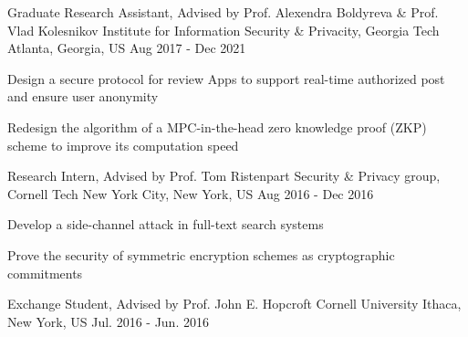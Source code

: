 


\begin{cventries}


\cventry
{Graduate Research Assistant, Advised by Prof. Alexendra Boldyreva \& Prof. Vlad Kolesnikov} %
{Institute for Information Security \& Privacity, Georgia Tech} %
{Atlanta, Georgia, US} %
{Aug 2017 - Dec 2021} %
{ %
\begin{cvitems}
\item {Design a secure protocol for review Apps to support real-time authorized post and ensure user anonymity}
\item {Redesign the algorithm of a MPC-in-the-head zero knowledge proof (ZKP) scheme to improve its computation speed}
\end{cvitems}
}


\cventry
{Research Intern, Advised by Prof. Tom Ristenpart} %
{Security \& Privacy group, Cornell Tech} %
{New York City, New York, US} %
{Aug 2016 - Dec 2016} %
{ %
\begin{cvitems}
\item {Develop a side-channel attack in full-text search systems}
\item {Prove the security of symmetric encryption schemes as cryptographic commitments}
\end{cvitems}
}


\cventry
{Exchange Student, Advised by Prof. John E. Hopcroft} %
{Cornell University} %
{Ithaca, New York, US} %
{Jul. 2016 - Jun. 2016} %
{ %
}


\end{cventries}
